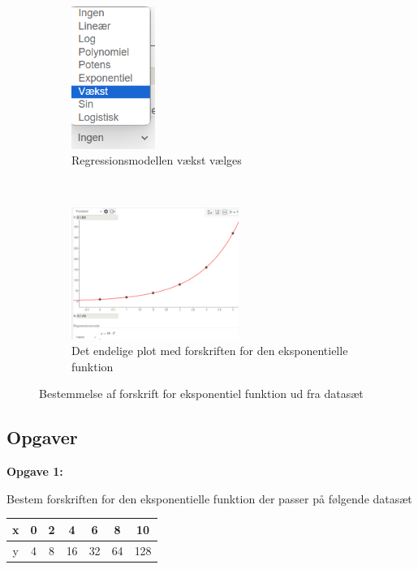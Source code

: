 \begin{figure}[ht]
    \centering
    \begin{subfigure}[t]{0.5\textwidth}
        \centering
        \includegraphics[width=0.3\textwidth]{img_5}
        \caption{Regressionsmodellen vækst vælges}
    \end{subfigure}%
    ~ 
    \begin{subfigure}[t]{0.5\textwidth}
        \centering
        \includegraphics[width=0.6\textwidth]{img_6}
        \caption{Det endelige plot med forskriften for den eksponentielle funktion}
    \end{subfigure}
    \caption{Bestemmelse af forskrift for eksponentiel funktion ud fra datasæt}
\end{figure}


\newpage

\subsection*{Opgaver}



\textbf{Opgave 1:}

Bestem forskriften for den eksponentielle funktion der passer på følgende datasæt
\begin{tabular}{c|c|c|c|c|c|c}
x & 0 & 2 & 4 & 6 & 8 & 10 \\\hline
y & 4 & 8 & 16 & 32 & 64 & 128
\end{tabular}

